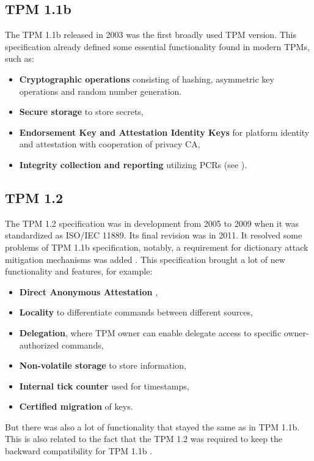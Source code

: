 \subsection{TPM 1.1b}
The TPM 1.1b released in 2003 was the first broadly used TPM version. This specification already defined some essential functionality found in modern TPMs, such as:
\begin{itemize}
    \item \textbf{Cryptographic operations} consisting of hashing, asymmetric key operations and random number generation.
    \item \textbf{Secure storage} to store secrets,
    \item \textbf{Endorsement Key and Attestation Identity Keys} for platform identity and attestation with cooperation of privacy CA,
    \item \textbf{Integrity collection and reporting} utilizing PCRs (see ).
\end{itemize}

\subsection{TPM 1.2}
The TPM 1.2 specification was in development from 2005 to 2009 when it was standardized as ISO/IEC 11889. Its final revision was in 2011. It resolved some problems of TPM 1.1b specification, notably, a requirement for dictionary attack mitigation mechanisms was added \cite[p.~36-37]{tcg_1.2_design_princ}. This specification brought a lot of new functionality and features, for example:
\begin{itemize}
    \item \textbf{Direct Anonymous Attestation} \cite{daaSpec, daaDesignAndImple},
    \item \textbf{Locality} to differentiate commands between different sources,
    \item \textbf{Delegation}, where TPM owner can enable delegate access to specific owner-authorized commands,
    \item \textbf{Non-volatile storage} to store information,
    \item \textbf{Internal tick counter} used for timestamps,
    \item \textbf{Certified migration} of keys.
\end{itemize}
But there was also a lot of functionality that stayed the same as in TPM 1.1b. This is also related to the fact that the TPM 1.2 was required to keep the backward compatibility for TPM 1.1b \cite[p.~169]{tcg_1.2_design_princ}.


